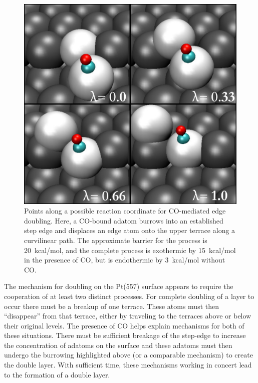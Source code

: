 \begin{figure}[p!]
\includegraphics[width=\linewidth]{../figures/chap2/rxn.pdf}
\caption{Points along a possible reaction coordinate for CO-mediated
  edge doubling. Here, a CO-bound adatom burrows into an established
  step edge and displaces an edge atom onto the upper terrace along a
  curvilinear path.  The approximate barrier for the process is
  20~kcal/mol, and the complete process is exothermic by 15~kcal/mol
  in the presence of CO, but is endothermic by 3~kcal/mol without CO.}
\label{fig:lambda}
\end{figure}

The mechanism for doubling on the Pt(557) surface appears to require
the cooperation of at least two distinct processes. For complete
doubling of a layer to occur there must be a breakup of one
terrace. These atoms must then ``disappear'' from that terrace, either
by traveling to the terraces above or below their original levels.
The presence of CO helps explain mechanisms for both of these
situations. There must be sufficient breakage of the step-edge to
increase the concentration of adatoms on the surface and these adatoms
must then undergo the burrowing highlighted above (or a comparable
mechanism) to create the double layer.  With sufficient time, these
mechanisms working in concert lead to the formation of a double layer.

